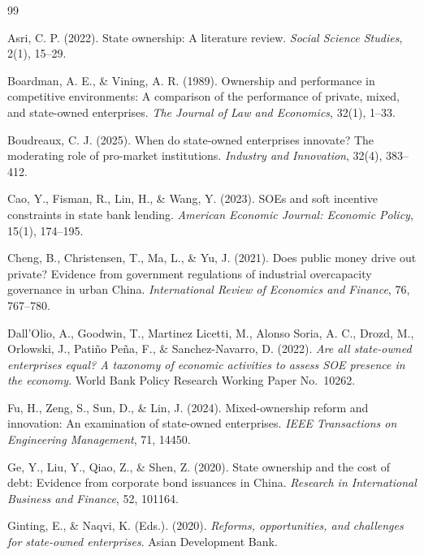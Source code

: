 \documentclass[11pt,a4paper]{article}
\begin{document}
\begin{thebibliography}{99}
\setlength{\itemsep}{0pt}

 Asri, C. P. (2022). State ownership: A literature review. \emph{Social Science Studies}, 2(1), 15--29.

 Boardman, A. E., \& Vining, A. R. (1989). Ownership and performance in competitive environments: A comparison of the performance of private, mixed, and state-owned enterprises. \emph{The Journal of Law and Economics}, 32(1), 1--33.

 Boudreaux, C. J. (2025). When do state-owned enterprises innovate? The moderating role of pro-market institutions. \emph{Industry and Innovation}, 32(4), 383--412.

 Cao, Y., Fisman, R., Lin, H., \& Wang, Y. (2023). SOEs and soft incentive constraints in state bank lending. \emph{American Economic Journal: Economic Policy}, 15(1), 174--195.

 Cheng, B., Christensen, T., Ma, L., \& Yu, J. (2021). Does public money drive out private? Evidence from government regulations of industrial overcapacity governance in urban China. \emph{International Review of Economics and Finance}, 76, 767--780.

 Dall'Olio, A., Goodwin, T., Martinez Licetti, M., Alonso Soria, A. C., Drozd, M., Orlowski, J., Pati\~no Pe\~na, F., \& Sanchez-Navarro, D. (2022). \emph{Are all state-owned enterprises equal? A taxonomy of economic activities to assess SOE presence in the economy}. World Bank Policy Research Working Paper No.~10262.

 Fu, H., Zeng, S., Sun, D., \& Lin, J. (2024). Mixed-ownership reform and innovation: An examination of state-owned enterprises. \emph{IEEE Transactions on Engineering Management}, 71, 14450.

 Ge, Y., Liu, Y., Qiao, Z., \& Shen, Z. (2020). State ownership and the cost of debt: Evidence from corporate bond issuances in China. \emph{Research in International Business and Finance}, 52, 101164.

 Ginting, E., \& Naqvi, K. (Eds.). (2020). \emph{Reforms, opportunities, and challenges for state-owned enterprises}. Asian Development Bank.


\end{thebibliography}
\end{document}
